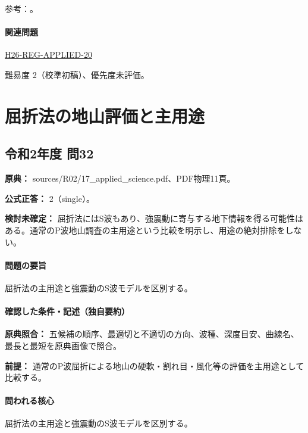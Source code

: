 \par 参考：\cite{seg_vertical_resolution,seg_lateral_resolution,usgs_refraction2013}。

\paragraph{関連問題} \hyperref[q:h26-reg-applied-20]{H26-REG-APPLIED-20}

\par 難易度 2（校準初稿）、優先度未評価。

\section{屈折法の地山評価と主用途}

\subsection{令和2年度 問32}
\label{q:r02-reg-applied-32}

\noindent\textbf{原典：} sources/R02/17\_applied\_science.pdf、PDF物理11頁。

\textbf{公式正答：} 2（single）。

\par\textbf{検討未確定：} 屈折法にはS波もあり、強震動に寄与する地下情報を得る可能性はある。通常のP波地山調査の主用途という比較を明示し、用途の絶対排除をしない。

\paragraph{問題の要旨} 屈折法の主用途と強震動のS波モデルを区別する。

\paragraph{確認した条件・記述（独自要約）}\mbox{}\par

\noindent\textbf{原典照合：} 五候補の順序、最適切と不適切の方向、波種、深度目安、曲線名、最長と最短を原典画像で照合。\par

\noindent\textbf{前提：} 通常のP波屈折による地山の硬軟・割れ目・風化等の評価を主用途として比較する。\par

\paragraph{問われる核心} 屈折法の主用途と強震動のS波モデルを区別する。

